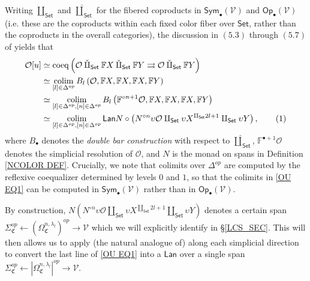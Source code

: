 \documentclass[a4paper,10pt
]{article}%
\numberwithin{equation}{section}
\numberwithin{figure}{section}
\theoremstyle{definition} %
\DeclareMathOperator{\colim}{colim}%
\renewcommand{\O}{\ensuremath{\mathcal O}}
\newcommand{\1}{\ensuremath{\mathbbm 1}}%
\begin{document}
Writing $\amalg_{\mathsf{Set}}$ and $\mathbin{\check\amalg}_{\mathsf{Set}}$
for the fibered coproducts in 
$\mathsf{Sym}_{\bullet}(\mathcal{V})$ and
$\mathsf{Op}_{\bullet}(\mathcal{V})$
(i.e. these are the coproducts within each fixed color fiber over $\mathsf{Set}$, rather than the coproducts in the overall categories),
the discussion in $(5.3)$ through $(5.7)$ of \cite{BP21}
yields that
\begin{align*}
\O[u]
&
\simeq \mathrm{coeq}\left(
\O \mathbin{\check\amalg_{\mathsf{Set}}} \mathbb F X \mathbin{\check\amalg}_{\mathsf{Set}} \mathbb F Y \rightrightarrows \O \mathbin{\check\amalg}_{\mathsf{Set}} \mathbb F Y
\right)
\\
&
\simeq \colim_{[l] \in \Delta^{op}} 
B_l \left( \O, \mathbb F X, \mathbb F X, \mathbb F X, \mathbb FY \right)
\\
&
\simeq \colim_{[l] \in \Delta^{op},[n] \in \Delta^{op}} 
B_l \left( \mathbb F^{\circ n+1} \O, \mathbb F X, \mathbb F X, \mathbb F X, \mathbb FY \right)
\\
&
\simeq \colim_{[l] \in \Delta^{op},[n] \in \Delta^{op}} 
\mathsf{Lan} N \circ \left( N^{\circ n} \upsilon \O \amalg_{\mathsf{Set}} \upsilon X^{\amalg_{\mathsf{Set}} 2l +1} \amalg_{\mathsf{Set}} \upsilon Y \right),
\stepcounter{equation}\tag{\theequation}\label{OU EQ1}
\end{align*}
where $B_{\bullet}$ denotes the \textit{double bar construction}
with respect to $\mathbin{\check\amalg}_{\mathsf{Set}}$,
$\mathbb{F}^{\bullet +1} \mathcal{O}$ denotes the simplicial resolution of $\mathcal{O}$, 
and $N$ is the monad on spans in Definition \ref{NCOLOR DEF}.
Crucially, we note that colimits over $\Delta^{op}$
are computed by the reflexive coequalizer determined by levels $0$ and $1$, 
so that the colimits in \eqref{OU EQ1}
can be computed in $\mathsf{Sym}_{\bullet}(\mathcal{V})$
rather than in $\mathsf{Op}_{\bullet}(\mathcal{V})$.

By construction,
$N \left(N^{\circ n} \upsilon \O \amalg_{\mathsf{Set}} \upsilon X^{\amalg_{\mathsf{Set}} 2l +1}\amalg_{\mathsf{Set}} \upsilon Y \right)$
denotes a certain span
$\Sigma_{\mathfrak{C}}^{op} \leftarrow 
\left(\Omega^{n,\lambda_l}_{\mathfrak{C}}\right)^{op} \to \mathcal{V}$
which we will explicitly identify 
in \S \ref{LCS_SEC}.
This will then allows us to 
apply (the natural analogue of)
\cite[Prop. 5.42]{BP21}
along each simplicial direction
to convert the last line of \eqref{OU EQ1}
into a $\mathsf{Lan}$
over a single span
$\Sigma_{\mathfrak{C}}^{op} \leftarrow 
\left|\Omega^{n,\lambda_l}_{\mathfrak{C}}\right|^{op} \to \mathcal{V}$.
\end{document}
